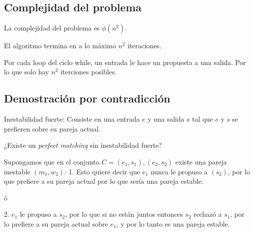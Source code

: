 \documentclass{article}
\begin{document}
\subsection*{Complejidad del problema}
La complejidad del problema es $\phi(n^2)$.
    
El algoritmo termina en a lo máximo $n^2$ iteraciones.
    
Por cada loop del ciclo while, un entrada le hace un propuesta a una salida. Por
lo que solo hay $n^2$ iterciones posibles. 
    
\subsection*{Demostración por contradicción}

Inestabilidad fuerte: Consiste en una entrada $e$ y una salida $s$ tal que $e$ y
$s$ se prefieren sobre su pareja actual.
    
¿Existe un \textit{perfect matching} sin inestabilidad fuerte?
    
Supongamos que en el conjunto $C = {(e_1,s_1),(e_2,s_2)}$ existe una pareja
inestable $(m_1,w_2)$:
1. Esto quiere decir que $e_1$ nunca le propuso a $(s_2)$, por lo que prefiere a
su pareja actual por lo que sería una pareja estable.

ó 

2. $e_1$ le propuso a $s_2$, por lo que si no están juntos entonces $s_2$
rechazó a $s_1$, por lo prefiere a su pareja actual sobre $e_1$, y por lo
tanto es una pareja estable.
\end{document}
